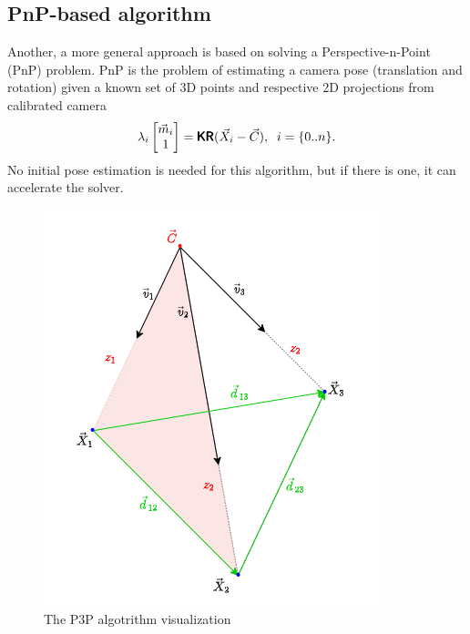 \subsection{PnP-based algorithm}
\label{sec:pnp}
Another, a more general approach is based on solving a Perspective-n-Point (PnP) problem.
PnP is the problem of estimating a camera pose (translation and rotation) given a known set of 3D points and respective 2D projections from calibrated camera
\begin{equation}
    \lambda_i \begin{bmatrix} \vec{m}_i \\ 1 \end{bmatrix} = \pmb{\mathsf{K}} \pmb{\mathsf{R}} (\vec{X}_i - \vec{C}), \;\; i = \{0..n\}.
\end{equation}
No initial pose estimation is needed for this algorithm, but if there is one, it can accelerate the solver.

\begin{figure}[h]
    \centering
    \includegraphics[width=.3\textwidth]{graphics/p3p.png}
    \caption{The P3P algotrithm visualization}
    \label{fig:p3p}
\end{figure}

